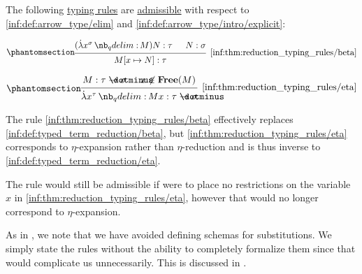 \begin{proposition}\label{thm:reduction_typing_rules}
  The following \hyperref[con:typing_rule]{typing rules} are \hyperref[con:inference_rule_admissibility]{admissible} with respect to \ref{inf:def:arrow_type/elim} and \ref{inf:def:arrow_type/intro/explicit}:
  \begin{paracol}{2}
    \begin{leftcolumn}
      \ParacolAlignmentHack
      \begin{equation*}\taglabel[\ensuremath{ \rightarrow_\beta }]{inf:thm:reduction_typing_rules/beta}
        \begin{prooftree}
          \hypo{ (\qabs {x^{\sigma}} M) N: \tau }
          \hypo{ N: \sigma }
          \infer2[\ref{inf:thm:reduction_typing_rules/beta}]{ M[x \mapsto N]: \tau }.
        \end{prooftree}
      \end{equation*}
    \end{leftcolumn}

    \begin{rightcolumn}
      \ParacolAlignmentHack
      \begin{equation*}\taglabel[\ensuremath{ \leftarrow_\eta }]{inf:thm:reduction_typing_rules/eta}
        \begin{prooftree}
          \hypo{ M: \tau \synimplies \sigma }
          \hypo{ x \not\in \op*{Free}(M) }
          \infer2[\ref{inf:thm:reduction_typing_rules/eta}]{ \qabs {x^{\tau}} M x: \tau \synimplies \sigma }.
        \end{prooftree}
      \end{equation*}
    \end{rightcolumn}
  \end{paracol}
\end{proposition}
\begin{comments}
  \item The rule \ref{inf:thm:reduction_typing_rules/beta} effectively replaces \ref{inf:def:typed_term_reduction/beta}, but \ref{inf:thm:reduction_typing_rules/eta} corresponds to \( \eta \)-expansion rather than \( \eta \)-reduction and is thus inverse to \ref{inf:def:typed_term_reduction/eta}.

  The rule would still be admissible if were to place no restrictions on the variable \( x \) in \ref{inf:thm:reduction_typing_rules/eta}, however that would no longer correspond to \( \eta \)-expansion.

  \item As in , we note that we have avoided defining schemas for substitutions. We simply state the rules without the ability to completely formalize them since that would complicate us unnecessarily. This is discussed in .
\end{comments}
